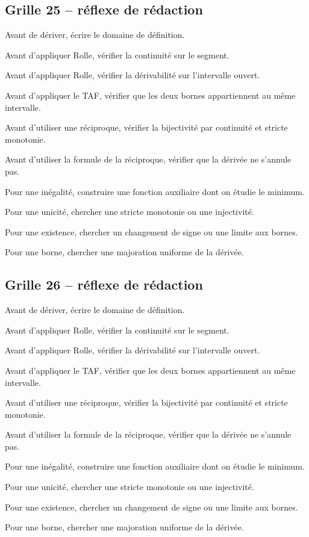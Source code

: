 \documentclass[11pt,a4paper]{article}
\begin{document}
\subsection*{Grille 25 -- réflexe de rédaction}

\begin{methodebox}

Avant de dériver, écrire le domaine de définition.

Avant d'appliquer Rolle, vérifier la continuité sur le segment.

Avant d'appliquer Rolle, vérifier la dérivabilité sur l'intervalle ouvert.

Avant d'appliquer le TAF, vérifier que les deux bornes appartiennent au même intervalle.

Avant d'utiliser une réciproque, vérifier la bijectivité par continuité et stricte monotonie.

Avant d'utiliser la formule de la réciproque, vérifier que la dérivée ne s'annule pas.

Pour une inégalité, construire une fonction auxiliaire dont on étudie le minimum.

Pour une unicité, chercher une stricte monotonie ou une injectivité.

Pour une existence, chercher un changement de signe ou une limite aux bornes.

Pour une borne, chercher une majoration uniforme de la dérivée.

\end{methodebox}

\subsection*{Grille 26 -- réflexe de rédaction}

\begin{methodebox}

Avant de dériver, écrire le domaine de définition.

Avant d'appliquer Rolle, vérifier la continuité sur le segment.

Avant d'appliquer Rolle, vérifier la dérivabilité sur l'intervalle ouvert.

Avant d'appliquer le TAF, vérifier que les deux bornes appartiennent au même intervalle.

Avant d'utiliser une réciproque, vérifier la bijectivité par continuité et stricte monotonie.

Avant d'utiliser la formule de la réciproque, vérifier que la dérivée ne s'annule pas.

Pour une inégalité, construire une fonction auxiliaire dont on étudie le minimum.

Pour une unicité, chercher une stricte monotonie ou une injectivité.

Pour une existence, chercher un changement de signe ou une limite aux bornes.

Pour une borne, chercher une majoration uniforme de la dérivée.

\end{methodebox}
\end{document}
